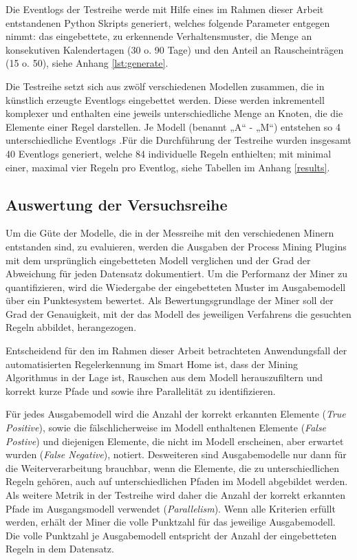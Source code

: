 Die Eventlogs der Testreihe werde mit Hilfe eines im Rahmen dieser Arbeit entstandenen Python Skripts generiert, welches folgende Parameter entgegen nimmt: das eingebettete, zu erkennende Verhaltensmuster, die Menge an konsekutiven Kalendertagen (30 o. 90 Tage) und den Anteil an Rauscheinträgen (15 o. 50), siehe Anhang \ref{lst:generate}. 

Die Testreihe setzt sich aus zwölf verschiedenen Modellen zusammen, die in künstlich erzeugte Eventlogs eingebettet werden. Diese werden inkrementell komplexer und enthalten eine jeweils unterschiedliche Menge an Knoten, die die Elemente einer Regel darstellen. Je Modell (benannt „A“ - „M“) entstehen so 4 unterschiedliche Eventlogs .Für die Durchführung der Testreihe wurden insgesamt 40 Eventlogs generiert, welche 84 individuelle Regeln enthielten; mit minimal einer, maximal vier Regeln pro Eventlog, siehe Tabellen im Anhang \ref{results}. 

\subsection{Auswertung der Versuchsreihe}
Um die Güte der Modelle, die in der Messreihe mit den verschiedenen Minern entstanden sind, zu evaluieren, werden die Ausgaben der Process Mining Plugins mit dem ursprünglich eingebetteten Modell verglichen und der Grad der Abweichung für jeden Datensatz dokumentiert. Um die Performanz der Miner zu quantifizieren, wird die Wiedergabe der eingebetteten Muster im Ausgabemodell über ein Punktesystem bewertet. Als Bewertungsgrundlage der Miner soll der Grad der Genauigkeit, mit der das Modell des jeweiligen Verfahrens die gesuchten Regeln abbildet, herangezogen. 

Entscheidend für den im Rahmen dieser Arbeit betrachteten Anwendungsfall der automatisierten Regelerkennung im Smart Home ist, dass der Mining Algorithmus in der Lage ist, Rauschen aus dem Modell herauszufiltern und korrekt kurze Pfade und sowie ihre Parallelität zu identifizieren. 

Für jedes Ausgabemodell wird die Anzahl der korrekt erkannten Elemente (\textit{True Positive}), sowie die fälschlicherweise im Modell enthaltenen Elemente (\textit{False Postive}) und diejenigen Elemente, die nicht im Modell erscheinen, aber erwartet wurden (\textit{False Negative}), notiert. 
Desweiteren sind Ausgabemodelle nur dann für die Weiterverarbeitung brauchbar, wenn die Elemente, die zu unterschiedlichen Regeln gehören, auch auf unterschiedlichen Pfaden im Modell abgebildet werden. Als weitere Metrik in der Testreihe wird daher die Anzahl der korrekt erkannten Pfade im Ausgangsmodell verwendet (\textit{Parallelism}). Wenn alle Kriterien erfüllt werden, erhält der Miner die volle Punktzahl für das jeweilige Ausgabemodell. Die volle Punktzahl je Ausgabemodell entspricht der Anzahl der eingebetteten Regeln in dem Datensatz.

